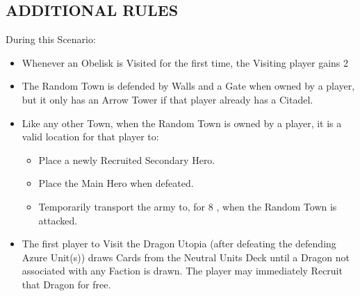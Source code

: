 \begin{multicols}{2}
\subsection*{\MakeUppercase{Additional Rules}}
During this Scenario:
\begin{itemize}
  \item Whenever an Obelisk is Visited for the first time, the Visiting player gains 2 
  \item The Random Town is defended by Walls and a Gate when owned by a player, but it only has an Arrow Tower if that player already has a Citadel.
  \item Like any other Town, when the Random Town is owned by a player, it is a valid location for that player to:
    \begin{itemize}
      \item Place a newly Recruited Secondary Hero.
      \item Place the Main Hero when defeated.
      \item Temporarily transport the army to, for 8 , when the Random Town is attacked.
    \end{itemize}
  \item The first player to Visit the Dragon Utopia (after defeating the defending Azure Unit(s)) draws Cards from the Neutral Units  Deck until a Dragon not associated with any Faction is drawn.
    The player may immediately Recruit that Dragon for free.
\end{itemize}

\columnbreak

\phantom{.}
\vfill
\begin{center}
\end{center}
\vfill
\phantom{.}
\end{multicols}



